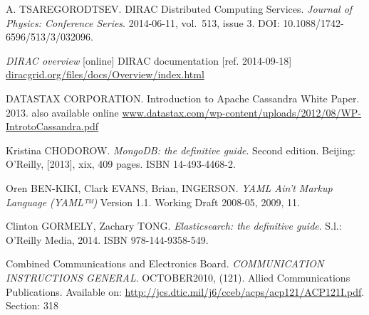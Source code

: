 \begin{thebibliography}{99}
	A. TSAREGORODTSEV.
	DIRAC Distributed Computing Services. 
	\textit{Journal of Physics: Conference Series}. 2014-06-11, vol.~513, issue 3. 
	DOI: 10.1088/1742-6596/513/3/032096. 

	\emph{DIRAC overview} [online] 
	DIRAC documentation [ref. 2014-09-18]
	\url{diracgrid.org/files/docs/Overview/index.html}

	DATASTAX CORPORATION. Introduction to Apache Cassandra White Paper. 2013.
	also available online \url{www.datastax.com/wp-content/uploads/2012/08/WP-IntrotoCassandra.pdf}
	
	Kristina CHODOROW. \textit{MongoDB: the definitive guide}. Second edition. 
	Beijing: O'Reilly, [2013], xix, 409 pages. ISBN 14-493-4468-2. 
	
	Oren BEN-KIKI, Clark EVANS, Brian, INGERSON. \textit{YAML Ain't Markup Language (YAML™)} 
	Version 1.1. Working Draft 2008-05, 2009, 11.	
	
	Clinton GORMELY, Zachary TONG. \textit{Elasticsearch: the definitive guide}. S.l.: 
	O'Reilly Media, 2014. ISBN 978-144-9358-549. 
	
	Combined Communications and Electronics Board. 
	\textit{COMMUNICATION INSTRUCTIONS GENERAL}. OCTOBER2010, (121). 
	Allied Communications Publications. 
	Available on: \url{http://jcs.dtic.mil/j6/cceb/acps/acp121/ACP121I.pdf}.
	Section: 318

	

		

\end{thebibliography}

